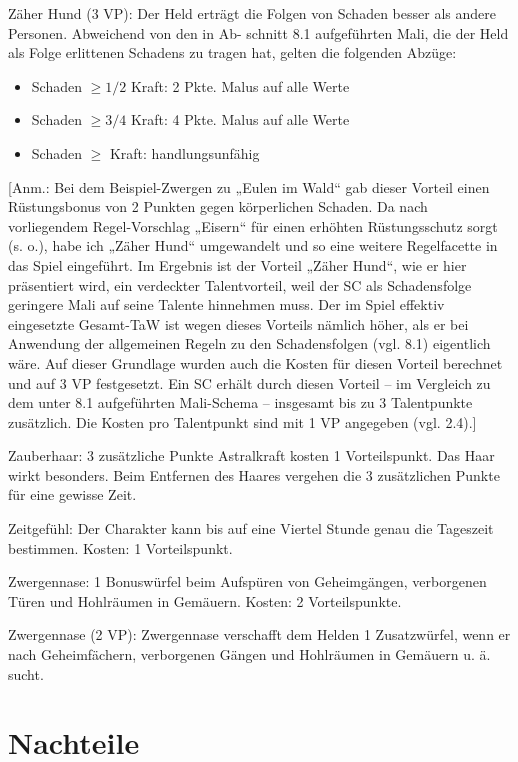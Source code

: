 \begin{description}
\item{Zäher Hund (3 VP):}
Der Held erträgt die Folgen von Schaden besser als andere Personen. Abweichend von den in Ab- schnitt 8.1 aufgeführten Mali, die der Held als Folge erlittenen Schadens zu tragen hat, gelten die folgenden Abzüge:
\begin{itemize}
\item Schaden $\ge 1/2$ Kraft: 2 Pkte. Malus auf alle Werte
\item Schaden $\ge 3/4$ Kraft: 4 Pkte. Malus auf alle Werte
\item Schaden $\ge$ Kraft:    handlungsunfähig
\end{itemize}
[Anm.: Bei dem Beispiel-Zwergen zu „Eulen im Wald“ gab dieser Vorteil einen Rüstungsbonus von 2 Punkten gegen körperlichen Schaden. Da nach vorliegendem Regel-Vorschlag „Eisern“ für einen erhöhten Rüstungsschutz sorgt (s. o.), habe ich „Zäher Hund“ umgewandelt und so eine weitere Regelfacette in das Spiel eingeführt. Im Ergebnis ist der Vorteil „Zäher Hund“, wie er hier präsentiert wird, ein verdeckter Talentvorteil, weil der SC als Schadensfolge geringere Mali auf seine Talente hinnehmen muss. Der im Spiel effektiv eingesetzte Gesamt-TaW ist wegen dieses Vorteils nämlich höher, als er bei Anwendung der allgemeinen Regeln zu den Schadensfolgen (vgl. 8.1) eigentlich wäre. Auf dieser Grundlage wurden auch die Kosten für diesen Vorteil berechnet und auf 3 VP festgesetzt. Ein SC erhält durch diesen Vorteil – im Vergleich zu dem unter 8.1 aufgeführten Mali-Schema – insgesamt bis zu 3 Talentpunkte zusätzlich. Die Kosten pro Talentpunkt sind mit 1 VP angegeben (vgl. 2.4).]

\item{Zauberhaar:} 3 zusätzliche Punkte Astralkraft kosten 1 Vorteilspunkt. Das Haar wirkt besonders. Beim Entfernen des Haares vergehen die 3 zusätzlichen Punkte für eine gewisse Zeit.

\item{Zeitgefühl:} Der Charakter kann bis auf eine Viertel Stunde genau die Tageszeit bestimmen. Kosten: 1 Vorteilspunkt.

\item{Zwergennase:} 1 Bonuswürfel beim Aufspüren von Geheimgängen, verborgenen Türen und Hohlräumen in Gemäuern. Kosten: 2 Vorteilspunkte.

\item{Zwergennase (2 VP):} Zwergennase verschafft dem Helden 1 Zusatzwürfel, wenn er nach Geheimfächern, verborgenen Gängen und Hohlräumen in Gemäuern u. ä. sucht.

\end{description}

\section{Nachteile}

\EN
